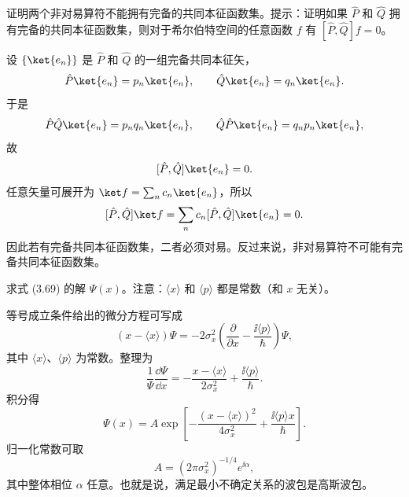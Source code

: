 \begin{question}
证明两个非对易算符不能拥有完备的共同本征函数集。提示：证明如果 $\hat P$ 和 $\hat Q$ 拥有完备的共同本征函数集，则对于希尔伯特空间的任意函数 $f$ 有 $[\hat P,\hat Q]f=0$。
\end{question}
\begin{solution}
设 $\{\ket{e_n}\}$ 是 $\hat P$ 和 $\hat Q$ 的一组完备共同本征矢，
\[
\hat P\ket{e_n}=p_n\ket{e_n},
\qquad
\hat Q\ket{e_n}=q_n\ket{e_n}.
\]
于是
\[
\hat P\hat Q\ket{e_n}=p_nq_n\ket{e_n},
\qquad
\hat Q\hat P\ket{e_n}=q_np_n\ket{e_n},
\]
故
\[
[\hat P,\hat Q]\ket{e_n}=0.
\]
任意矢量可展开为 $\ket f=\sum_n c_n\ket{e_n}$，所以
\[
[\hat P,\hat Q]\ket f=\sum_n c_n[\hat P,\hat Q]\ket{e_n}=0.
\]
因此若有完备共同本征函数集，二者必须对易。反过来说，非对易算符不可能有完备共同本征函数集。
\end{solution}

\begin{question}
求式 (3.69) 的解 $\Psi(x)$。注意：$\langle x\rangle$ 和 $\langle p\rangle$ 都是常数（和 $x$ 无关）。

\par\smallskip
{}

\end{question}
\begin{solution}
等号成立条件给出的微分方程可写成
\[
\left(x-\langle x\rangle\right)\Psi
=-2\sigma_x^2\left(\frac{\partial}{\partial x}-\frac{\ii\langle p\rangle}{\hbar}\right)\Psi,
\]
其中 $\langle x\rangle$、$\langle p\rangle$ 为常数。整理为
\[
\frac1\Psi\frac{\dd\Psi}{\dd x}
=-\frac{x-\langle x\rangle}{2\sigma_x^2}+\frac{\ii\langle p\rangle}{\hbar}.
\]
积分得
\[
\Psi(x)=A\exp\left[-\frac{(x-\langle x\rangle)^2}{4\sigma_x^2}
+\frac{\ii\langle p\rangle x}{\hbar}\right].
\]
归一化常数可取
\[
A=(2\pi\sigma_x^2)^{-1/4}e^{\ii\alpha},
\]
其中整体相位 $\alpha$ 任意。也就是说，满足最小不确定关系的波包是高斯波包。
\end{solution}

